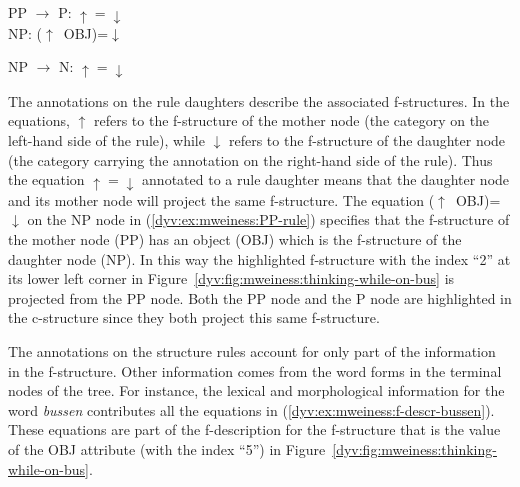 \documentclass[output=paper]{langsci/langscibook}
\begin{document}
\ea\label{dyv:ex:mweiness:PP-rule}
{\small 
PP	$\rightarrow$	P: $\uparrow=\downarrow$ \\
\hspace{2.3em} NP: ($\uparrow$~OBJ)=$\downarrow$
}
\z

\ea\label{dyv:ex:mweiness:NP-rule}
{\small 
NP	$\rightarrow$	N: $\uparrow=\downarrow$ \\
}
\z

The annotations on the rule daughters describe the associated f-structures.
In the equations, $\uparrow$ refers to the f-structure of the mother node (the category on the left-hand side of the rule), while $\downarrow$ refers to the f-structure of the daughter node (the category carrying the annotation on the right-hand side of the rule).
Thus the equation $\uparrow=\downarrow$ annotated to a rule daughter means that the daughter node and its mother node will project the same f-structure.
The equation ($\uparrow$~OBJ)=$\downarrow$ on the NP node in (\ref{dyv:ex:mweiness:PP-rule}) specifies that the f-structure of the mother node (PP) has an object (OBJ) which is the f-structure of the daughter node (NP).
In this way the highlighted f-structure with the index ``2'' at its lower left corner in Figure~\ref{dyv:fig:mweiness:thinking-while-on-bus} is projected from the PP node.
Both the PP node and the P node are highlighted in the c-structure since they both project this same f-structure.

The annotations on the  structure rules account for only part of the information in the f-structure.
Other information comes from the word forms in the terminal nodes of the tree.
For instance, the lexical and morphological information for the word \textit{bussen} contributes all the equations in (\ref{dyv:ex:mweiness:f-descr-bussen}).
These equations are part of the f-description for the f-structure that is the value of the OBJ attribute (with the index ``5'') in Figure~\ref{dyv:fig:mweiness:thinking-while-on-bus}.

\end{document}
